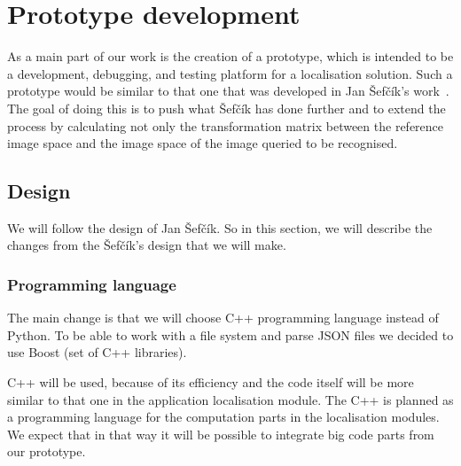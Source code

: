 \documentclass[thesis=B,english]{FITthesis}[2019/12/23]
\begin{document}
\chapter{Prototype development}
    As a main part of our work is the creation of a prototype, which is intended to be a development, debugging, and testing platform for a localisation solution. Such a prototype would be similar to that one that was developed in Jan Šefčík’s work~\cite{Sefcik2020}. The goal of doing this is to push what Šefčík has done further and to extend the process by calculating not only the transformation matrix between the reference image space and the image space of the image queried to be recognised.
    
    \section{Design}
        We will follow the design of Jan Šefčík\cite{Sefcik2020}. So in this section, we will describe the changes from the Šefčík's design that we will make.
        
        \subsection{Programming language}
        The main change is that we will choose C++ programming language instead of Python. To be able to work with a file system and parse JSON files we decided to use Boost (set of C++ libraries).
        
        C++ will be used, because of its efficiency and the code itself will be more similar to that one in the application localisation module. The C++ is planned as a programming language for the computation parts in the localisation modules. We expect that in that way it will be possible to integrate big code parts from our prototype.
 
\end{document}
